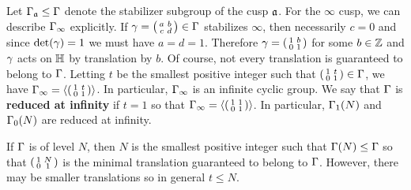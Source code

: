     Let $\Gamma_{\mathfrak{a}} \le \Gamma$ denote the stabilizer subgroup of the cusp $\mathfrak{a}$. For the $\infty$ cusp, we can describe $\Gamma_{\infty}$ explicitly. If $\gamma = \begin{psmallmatrix} a & b \\ c & d \end{psmallmatrix} \in \Gamma$ stabilizes $\infty$, then necessarily $c = 0$ and since $\det(\gamma) = 1$ we must have $a = d = 1$. Therefore $\gamma = \begin{psmallmatrix} 1 & b \\ 0 & 1 \end{psmallmatrix}$ for some $b \in \mathbb{Z}$ and $\gamma$ acts on $\mathbb{H}$ by translation by $b$. Of course, not every translation is guaranteed to belong to $\Gamma$. Letting $t$ be the smallest positive integer such that $\begin{psmallmatrix} 1 & t \\ 0 & 1 \end{psmallmatrix} \in \Gamma$, we have $\Gamma_{\infty} = \left\langle\begin{psmallmatrix} 1 & t \\ 0 & 1 \end{psmallmatrix}\right\rangle$. In particular, $\Gamma_{\infty}$ is an infinite cyclic group. We say that $\Gamma$ is \textbf{reduced at infinity} if $t = 1$ so that $\Gamma_{\infty} = \left\langle\begin{psmallmatrix} 1 & 1 \\ 0 & 1 \end{psmallmatrix}\right\rangle$. In particular, $\Gamma_{1}(N)$ and $\Gamma_{0}(N)$ are reduced at infinity.
    
    \begin{remark}
      If $\Gamma$ is of level $N$, then $N$ is the smallest positive integer such that $\Gamma(N) \le \Gamma$ so that $\begin{psmallmatrix} 1 & N \\ 0 & 1 \end{psmallmatrix}$ is the minimal translation guaranteed to belong to $\Gamma$. However, there may be smaller translations so in general $t \le N$.
    \end{remark}
    

